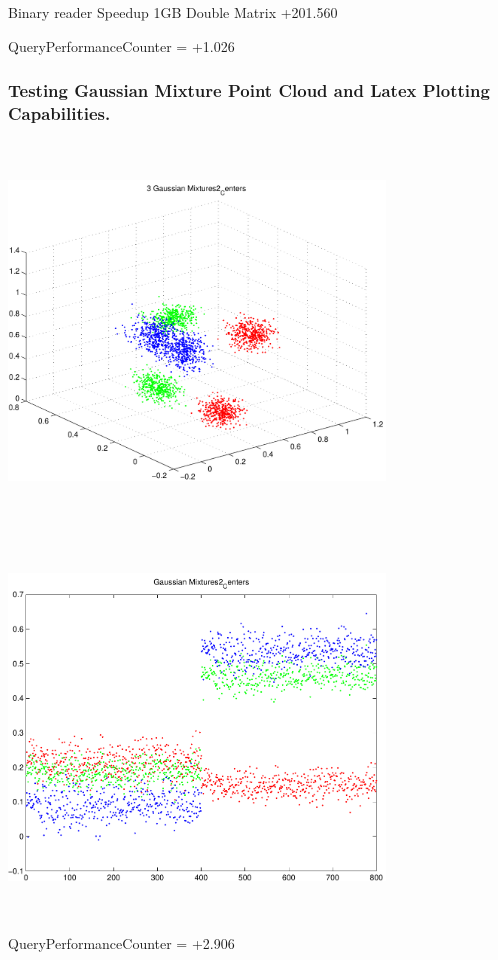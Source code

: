 \documentclass[9pt]{article}
\theoremstyle{plain}
\theoremstyle{definition}
\theoremstyle{remark}
\numberwithin{equation}{section}
\begin{document}
Binary reader Speedup 1GB Double Matrix +201.560

QueryPerformanceCounter  =  +1.026
\subsubsection{Testing Gaussian Mixture Point Cloud and Latex Plotting Capabilities.}
\includegraphics[width=10.0cm,height=10.0cm]{GaussianMixture_Dim_3_Centers2.pdf}

\includegraphics[width=10.0cm,height=10.0cm]{GaussianMixture_Dim_1_Centers2.pdf}

QueryPerformanceCounter  =  +2.906
\end{document}
